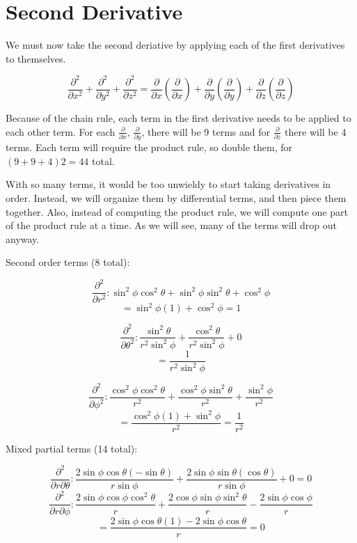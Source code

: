 \documentclass{article}
\begin{document}
\section{Second Derivative}

We must now take the second deriative by applying each of the first derivatives to themselves. 

$$\frac{\partial^{2}}{\partial x^{2}} + \frac{\partial^{2}}{\partial y^{2}} + \frac{\partial^{2}}{\partial z^{2}}=\frac{\partial}{\partial x}(\frac{\partial}{\partial x}) + \frac{\partial}{\partial y}(\frac{\partial}{\partial y}) + \frac{\partial}{\partial z}(\frac{\partial}{\partial z})$$

Because of the chain rule, each term in the first derivative needs to be applied to each other term. For each $\frac{\partial}{\partial x}$, $\frac{\partial}{\partial y}$, there will be 9 terms and for $\frac{\partial}{\partial z}$ there will be 4 terms. Each term will require the product rule, so double them, for $(9+9+4)2=44$ total.

With so many terms, it would be too unwieldy to start taking derivatives in order. Instead, we will organize them by differential terms, and then piece them together. Also, instead of computing the product rule, we will compute one part of the product rule at a time. As we will see, many of the terms will drop out anyway.

Second order terms (8 total):

$$\frac{\partial^{2}}{\partial r^{2}}:\sin^{2}\phi\cos^{2}\theta+\sin^{2}\phi\sin^{2}\theta+\cos^{2}\phi$$
$$=\sin^{2}\phi(1)+\cos^{2}\phi=1$$

$$\frac{\partial^{2}}{\partial \theta^{2}}:\frac{\sin^{2}\theta}{r^{2}\sin^{2}\phi}+\frac{\cos^{2}\theta}{r^{2}\sin^{2}\phi}+0$$
$$=\frac{1}{r^{2}\sin^{2}\phi}$$

$$\frac{\partial^{2}}{\partial \phi^{2}}:\frac{\cos^{2}\phi\cos^{2}\theta}{r^{2}} + \frac{\cos^{2}\phi\sin^{2}\theta}{r^{2}} + \frac{\sin^{2}\phi}{r^{2}}$$
$$=\frac{\cos^{2}\phi(1)+\sin^{2}\phi}{r^{2}}=\frac{1}{r^{2}}$$

Mixed partial terms (14 total):

$$\frac{\partial^{2}}{\partial r \partial\theta}: \frac{2\sin\phi\cos\theta(-\sin\theta)}{r\sin\phi}+\frac{2\sin\phi\sin\theta(\cos\theta)}{r\sin\phi}+0=0$$
$$\frac{\partial^{2}}{\partial r \partial\phi}: \frac{2\sin\phi\cos\phi\cos^{2}\theta}{r} + \frac{2\cos\phi\sin\phi\sin^{2}\theta}{r} -\frac{2\sin\phi\cos\phi}{r}$$
$$=\frac{2\sin\phi\cos\theta(1) - 2\sin\phi\cos\theta}{r}=0$$
\end{document}
